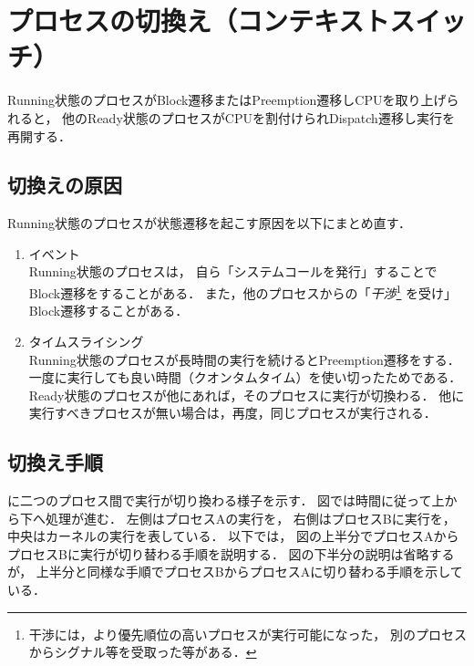 \section{プロセスの切換え（コンテキストスイッチ）}
Running状態のプロセスがBlock遷移またはPreemption遷移しCPUを取り上げられると，
他のReady状態のプロセスがCPUを割付けられDispatch遷移し実行を再開する．

\subsection{切換えの原因}
Running状態のプロセスが状態遷移を起こす原因を以下にまとめ直す．

\begin{enumerate}
\item イベント \\
  Running状態のプロセスは，
  自ら「システムコールを発行」することでBlock遷移をすることがある．
  また，他のプロセスからの「\emph{干渉}\footnote{
      干渉には，より優先順位の高いプロセスが実行可能になった，
      別のプロセスからシグナル等を受取った等がある．}
    を受け」Block遷移することがある．
\item タイムスライシング \\
  Running状態のプロセスが長時間の実行を続けるとPreemption遷移をする．
  一度に実行しても良い時間（クオンタムタイム）を使い切ったためである．
  Ready状態のプロセスが他にあれば，そのプロセスに実行が切換わる．
  他に実行すべきプロセスが無い場合は，再度，同じプロセスが実行される．
\end{enumerate}

\subsection{切換え手順}
に二つのプロセス間で実行が切り換わる様子を示す．
図では時間に従って上から下へ処理が進む．
左側はプロセスAの実行を，
右側はプロセスBに実行を，
中央はカーネルの実行を表している．
以下では，
図の上半分でプロセスAからプロセスBに実行が切り替わる手順を説明する．
図の下半分の説明は省略するが，
上半分と同様な手順でプロセスBからプロセスAに切り替わる手順を示している．

